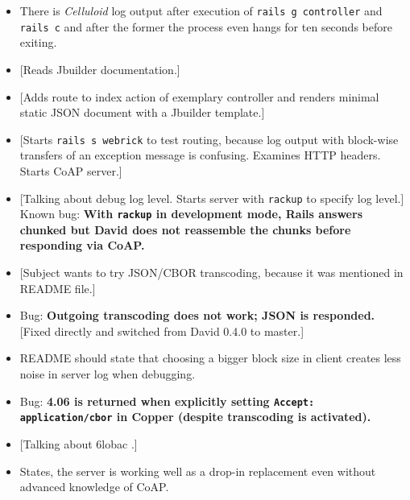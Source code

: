 \begin{itemize}
{				in between a block-wise transaction?} {[}The ETag option is
				changed and the client can try to obtain the full
				representation, again.{]}
			\item There is \emph{Celluloid} log output after execution of
				\texttt{rails g controller} and \texttt{rails c} and after the
				former the process even hangs for ten seconds before exiting.
			\item {[}Reads Jbuilder documentation.{]}
			\item {[}Adds route to index action of exemplary controller and
				renders minimal static \ac{JSON} document with a Jbuilder
				template.{]}
			\item {[}Starts \texttt{rails s webrick} to test routing, because
				log output with block-wise transfers of an exception message is
				confusing. Examines \ac{HTTP} headers. Starts \ac{CoAP}
				server.{]}
			\item {[}Talking about debug log level. Starts server with
				\texttt{rackup} to specify log level.{]} Known bug:
				\textbf{With \texttt{rackup} in development mode, \ac{Rails}
				answers chunked but David does not reassemble the chunks before
				responding via \ac{CoAP}.}
			\item {[}Subject wants to try \ac{JSON}/\ac{CBOR} transcoding,
				because it was mentioned in README file.{]}
			\item Bug: \textbf{Outgoing transcoding does not work; \ac{JSON} is
				responded.} {[}Fixed directly and switched from David 0.4.0 to
				master.{]}
			\item README should state that choosing a bigger block size in
				client creates less noise in server log when debugging.
			\item Bug: \textbf{4.06 is returned when explicitly setting
				\texttt{Accept: application/cbor} in Copper (despite
				transcoding is activated).}
			\item {[}Talking about 6lobac \cite{6lobac}.{]}
			\item States, the server is working well as a drop-in replacement
				even without advanced knowledge of \ac{CoAP}.
		\end{itemize}
